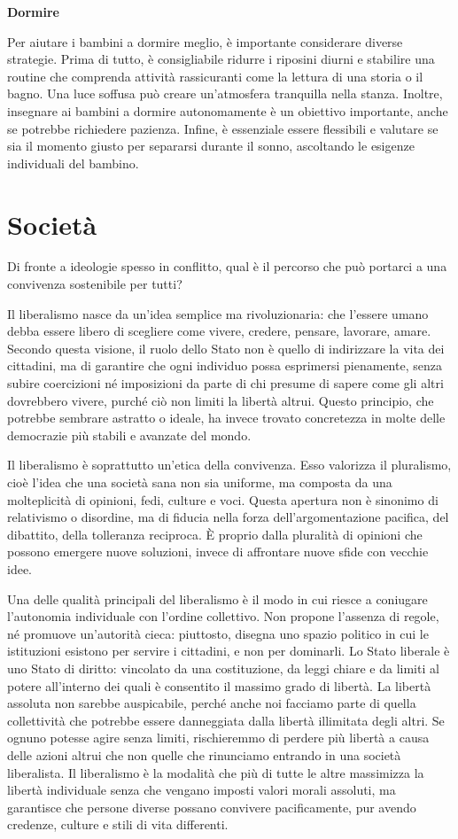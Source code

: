 \documentclass[12pt]{book} %
\begin{document}
\textbf{Dormire}

Per aiutare i bambini a dormire meglio, è importante considerare diverse strategie. Prima di tutto, è consigliabile
ridurre i riposini diurni e stabilire una routine che comprenda attività rassicuranti come la lettura di una storia o
il bagno. Una luce soffusa può creare un'atmosfera tranquilla nella stanza. Inoltre, insegnare ai bambini a dormire
autonomamente è un obiettivo importante, anche se potrebbe richiedere pazienza. Infine, è essenziale essere flessibili
e valutare se sia il momento giusto per separarsi durante il sonno, ascoltando le esigenze individuali del bambino.

\clearpage\section{Società}
Di fronte a ideologie spesso in conflitto, qual è il percorso che può portarci a una convivenza sostenibile per tutti?

Il liberalismo nasce da un’idea semplice ma rivoluzionaria: che l’essere umano debba essere libero di scegliere come vivere, credere, pensare, lavorare, amare. Secondo questa visione, il ruolo dello Stato non è quello di indirizzare la vita dei cittadini, ma di garantire che ogni individuo possa esprimersi pienamente, senza subire coercizioni né imposizioni da parte di chi presume di sapere come gli altri dovrebbero vivere, purché ciò non limiti la libertà altrui. Questo principio, che potrebbe sembrare astratto o ideale, ha invece trovato concretezza in molte delle democrazie più stabili e avanzate del mondo.

Il liberalismo è soprattutto un’etica della convivenza. Esso valorizza il pluralismo, cioè l’idea che una società sana non sia uniforme, ma composta da una molteplicità di opinioni, fedi, culture e voci. Questa apertura non è sinonimo di relativismo o disordine, ma di fiducia nella forza dell’argomentazione pacifica, del dibattito, della tolleranza reciproca. È proprio dalla pluralità di opinioni che possono emergere nuove soluzioni, invece di affrontare nuove sfide con vecchie idee.

Una delle qualità principali del liberalismo è il modo in cui riesce a coniugare l'autonomia individuale con l'ordine collettivo. Non propone l’assenza di regole, né promuove un’autorità cieca: piuttosto, disegna uno spazio politico in cui le istituzioni esistono per servire i cittadini, e non per dominarli. Lo Stato liberale è uno Stato di diritto: vincolato da una costituzione, da leggi chiare e da limiti al potere all'interno dei quali è consentito il massimo grado di libertà. La libertà assoluta non sarebbe auspicabile, perché anche noi facciamo parte di quella collettività che potrebbe essere danneggiata dalla libertà illimitata degli altri. Se ognuno potesse agire senza limiti, rischieremmo di perdere più libertà a causa delle azioni altrui che non quelle che rinunciamo entrando in una società liberalista. Il liberalismo è la modalità che più di tutte le altre massimizza la libertà individuale senza che vengano imposti valori morali assoluti, ma garantisce che persone diverse possano convivere pacificamente, pur avendo credenze, culture e stili di vita differenti.
\end{document}
